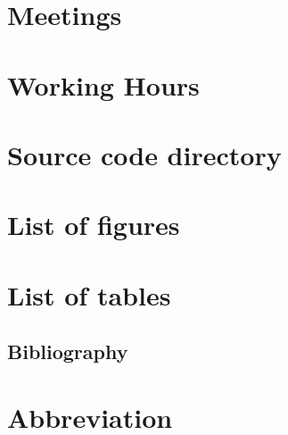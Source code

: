 \singlespacing    %

\section{Meetings}
    
\pagebreak

\section{Working Hours}
    
\pagebreak

\section{Source code directory}

\pagebreak

\section{List of figures}
{\def\section*#1{}\listoffigures}
\pagebreak

\section{List of tables}
    {\def\section*#1{}\listoftables}
\pagebreak

\begin{flushleft}
        \section{Bibliography}
    \renewcommand{\headrulewidth}{0.4pt}
    {\def\section*#1{}\printbibliography}
\end{flushleft}
\newpage

\section{Abbreviation}

